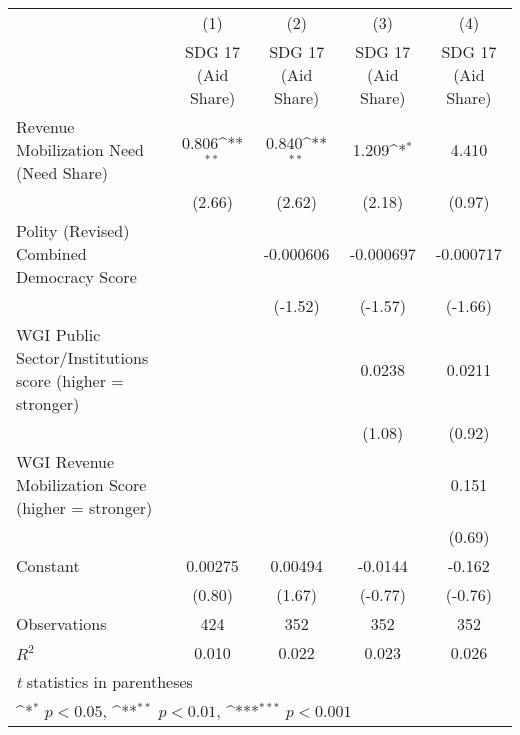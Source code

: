 {
\def\sym#1{\ifmmode^{#1}\else\(^{#1}\)\fi}
\begin{tabular}{l*{4}{c}}
\hline\hline
                &\multicolumn{1}{c}{(1)}&\multicolumn{1}{c}{(2)}&\multicolumn{1}{c}{(3)}&\multicolumn{1}{c}{(4)}\\
                &\multicolumn{1}{c}{SDG 17 (Aid Share)}&\multicolumn{1}{c}{SDG 17 (Aid Share)}&\multicolumn{1}{c}{SDG 17 (Aid Share)}&\multicolumn{1}{c}{SDG 17 (Aid Share)}\\
\hline
Revenue Mobilization Need (Need Share)&    0.806\sym{**} &    0.840\sym{**} &    1.209\sym{*}  &    4.410         \\
                &   (2.66)         &   (2.62)         &   (2.18)         &   (0.97)         \\
[1em]
Polity (Revised) Combined Democracy Score&                  &-0.000606         &-0.000697         &-0.000717         \\
                &                  &  (-1.52)         &  (-1.57)         &  (-1.66)         \\
[1em]
WGI Public Sector/Institutions score (higher = stronger)&                  &                  &   0.0238         &   0.0211         \\
                &                  &                  &   (1.08)         &   (0.92)         \\
[1em]
WGI Revenue Mobilization Score (higher = stronger)&                  &                  &                  &    0.151         \\
                &                  &                  &                  &   (0.69)         \\
[1em]
Constant        &  0.00275         &  0.00494         &  -0.0144         &   -0.162         \\
                &   (0.80)         &   (1.67)         &  (-0.77)         &  (-0.76)         \\
\hline
Observations    &      424         &      352         &      352         &      352         \\
\(R^{2}\)       &    0.010         &    0.022         &    0.023         &    0.026         \\
\hline\hline
\multicolumn{5}{l}{\footnotesize \textit{t} statistics in parentheses}\\
\multicolumn{5}{l}{\footnotesize \sym{*} \(p<0.05\), \sym{**} \(p<0.01\), \sym{***} \(p<0.001\)}\\
\end{tabular}
}
